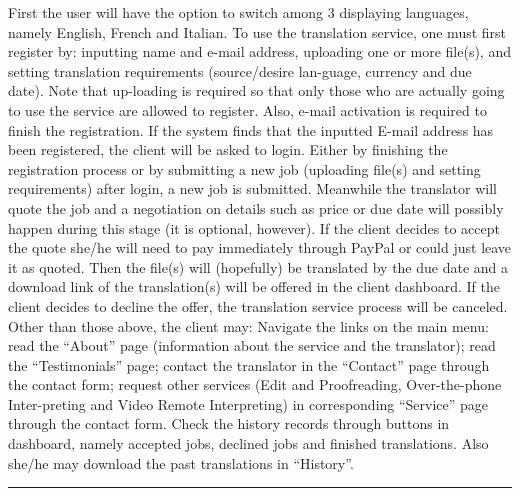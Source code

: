 \documentclass{l3proj}
\begin{document}
First the user will have the option to switch among 3 displaying languages, namely English, French and Italian.
To use the translation service, one must first register by: inputting name and e-mail address, uploading one or more file(s), and setting translation requirements (source/desire lan-guage, currency and due date). Note that up-loading is required so that only those who are actually going to use the service are allowed to register. Also, e-mail activation is required to finish the registration. If the system finds that the inputted E-mail address has been registered, the client will be asked to login.
Either by finishing the registration process or by submitting a new job (uploading file(s) and setting requirements) after login, a new job is submitted.
Meanwhile the translator will quote the job and a negotiation on details such as price or due date will possibly happen during this stage (it is optional, however).
If the client decides to accept the quote she/he will need to pay immediately through PayPal or could just leave it as quoted. Then the file(s) will (hopefully) be translated by the due date and a download link of the translation(s) will be offered in the client dashboard.
If the client decides to decline the offer, the translation service process will be canceled.
Other than those above, the client may:
Navigate the links on the main menu: read the “About” page (information about the service and the translator); read the “Testimonials” page; contact the translator in the “Contact” page through the contact form; request other services (Edit and Proofreading, Over-the-phone Inter-preting and Video Remote Interpreting) in corresponding “Service” page through the contact form.
Check the history records through buttons in dashboard, namely accepted jobs, declined jobs and finished translations. Also she/he may download the past translations in “History”.\newline
\rule{430pt}{1pt}
\end{document}
